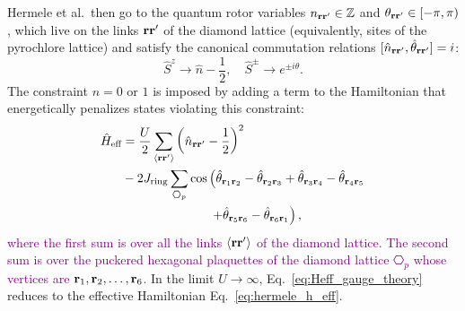 \documentclass[twocolumn,superscriptaddress,amsmath,amssymb,aps,prx,nofootinbib]{revtex4-2}
\newcommand{\newtext}[1]{\textcolor{purple}{#1}}
\begin{document}
Hermele et al.~then go to the quantum rotor variables $n_{\vb{r}\vb{r}'} \in \mathbb{Z}$ and $\theta_{\vb{r}\vb{r}'} \in [-\pi,\pi)$, which live on the links $\vb{r}\vb{r}'$ of the diamond lattice (equivalently, sites of the pyrochlore lattice) and satisfy the canonical commutation relations $[\hat{n}_{\vb{r}\vb{r}'} ,\hat{\theta}_{\vb{r}\vb{r}'} ] = i$:
\begin{equation} \label{eq:rotor_mapping}
  \hat{S}^z \rightarrow \hat{n} - \frac{1}{2},  \quad  \hat{S}^\pm  \rightarrow e^{ \pm i\hat{\theta}}.
\end{equation}
The constraint $n = 0 \text{ or }1$ is imposed by adding a term to the Hamiltonian that energetically penalizes states violating this constraint: 
\newtext{
\begin{align} \label{eq:Heff_gauge_theory}
  \hat{H}_{\text{eff}} & =   \frac{U}{2} \sum_{\langle \vb{r}\vb{r}' \rangle} \left( \hat{n}_{\vb{r}\vb{r'}} -\frac{1}{2} \right)^2 \\ \nonumber
&  - 2 J_{\text{ring}} \sum_{\hexagon_p} \cos\left(\hat{\theta}_{\vb{r}_1\vb{r}_2} -\hat{\theta}_{\vb{r}_2 \vb{r}_3}+\hat{\theta}_{\vb{r}_3\vb{r}_4}- \hat{\theta}_{\vb{r}_4\vb{r}_5}\right.\\
& \quad \quad \quad \quad \quad \quad \quad \left.+\hat{\theta}_{\vb{r}_5\vb{r}_6}-\hat{\theta}_{\vb{r}_6\vb{r}_1}\right),
\end{align}
where the first sum is over all the links $\langle\vb{r}\vb{r}'\rangle$ of the diamond lattice. The second sum is over the puckered hexagonal plaquettes of the diamond lattice $\hexagon_p$  whose vertices are $\vb{r}_1, \vb{r}_2, \ldots ,\vb{r}_6$.}
In the limit $U \rightarrow \infty$, Eq.~\eqref{eq:Heff_gauge_theory} reduces to the effective Hamiltonian Eq.~\eqref{eq:hermele_h_eff}.
\end{document}
